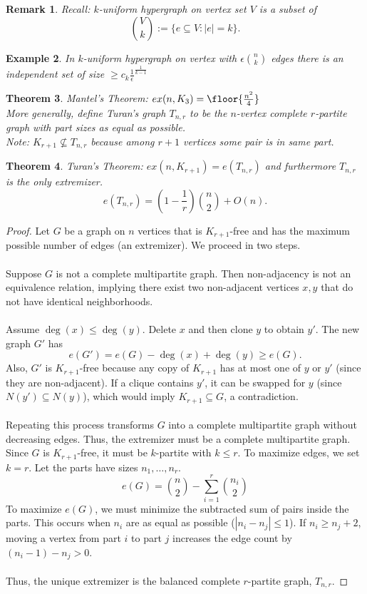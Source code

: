 \documentclass[a4paper]{article}
\newtheorem{thm}{Theorem}[section]
\newtheorem{eg}[thm]{Example}
\newtheorem{rmk}[thm]{Remark}
\begin{document}
\begin{rmk}
    Recall: $k$-uniform hypergraph on vertex set $V$ is a subset of \[
    {V \choose k}:= \{e\subseteq V: |e|=k\}
    .\] 
\end{rmk}
\begin{eg}
    In $k$-uniform hypergraph on vertex with $\epsilon {n\choose k}$ edges there is an independent set of size $\geq c_k \frac{1}{\epsilon}^{\frac{1}{k-1}}$
\end{eg}
\begin{thm} Mantel's Theorem: 
    $ex(n,K_3)=\floor{\frac{n^2}{4}}$\\
    More generally, define Turan's graph $T_{n,r}$ to be the $n$-vertex complete $r$-partite graph with part sizes as equal as possible.\\
    Note: $K_{r+1}\not \subseteq T_{n,r}$ because among $r+1$ vertices some pair is in same part. 
\end{thm}

\begin{thm}
    Turan's Theorem: $ex(n,K_{r+1})=e(T_{n,r})$ and furthermore $T_{n,r}$ is the only extremizer.
    \[
    e(T_{n,r})=\left (1-\frac{1}{r} \right ) {n \choose 2}+ O(n) 
    .\]
\end{thm}
\begin{proof}
        Let $G$ be a graph on $n$ vertices that is $K_{r+1}$-free and has the maximum possible number of edges (an extremizer). We proceed in two steps.\\\\
        Suppose $G$ is not a complete multipartite graph. Then non-adjacency is not an equivalence relation, implying there exist two non-adjacent vertices $x,y$ that do not have identical neighborhoods.\\\\
        Assume $\deg(x)\leq \deg(y)$. Delete $x$ and then clone $y$ to obtain $y'$. The new graph $G'$ has 
        \[
        e(G') = e(G) - \deg(x) + \deg(y) \geq e(G).
        \]
        Also, $G'$ is $K_{r+1}$-free because any copy of $K_{r+1}$ has at most one of $y$ or $y'$ (since they are non-adjacent). If a clique contains $y'$, it can be swapped for $y$ (since $N(y') \subseteq N(y)$), which would imply $K_{r+1}\subseteq G$, a contradiction.\\\\
        Repeating this process transforms $G$ into a complete multipartite graph without decreasing edges. Thus, the extremizer must be a complete multipartite graph.\\
        Since $G$ is $K_{r+1}$-free, it must be $k$-partite with $k \leq r$. To maximize edges, we set $k=r$. Let the parts have sizes $n_1, \dots, n_r$.
        \[
        e(G) = {n \choose 2} - \sum_{i=1}^r {n_i \choose 2}
        \]
        To maximize $e(G)$, we must minimize the subtracted sum of pairs inside the parts. This occurs when $n_i$ are as equal as possible ($|n_i - n_j| \leq 1$). If $n_i \geq n_j + 2$, moving a vertex from part $i$ to part $j$ increases the edge count by $(n_i-1) - n_j > 0$.\\\\
        Thus, the unique extremizer is the balanced complete $r$-partite graph, $T_{n,r}$.
\end{proof}
\newpage
\end{document}
